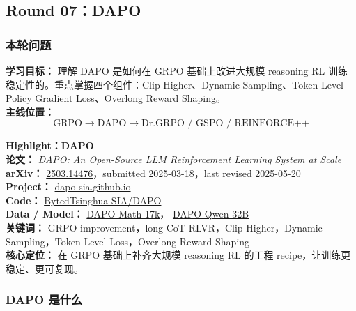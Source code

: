 
\subsection{Round 07：DAPO}

\subsubsection{本轮问题}

\begin{conceptbox}
\textbf{学习目标：} 理解 DAPO 是如何在 GRPO 基础上改进大规模 reasoning RL 训练稳定性的。重点掌握四个组件：Clip-Higher、Dynamic Sampling、Token-Level Policy Gradient Loss、Overlong Reward Shaping。\\
\textbf{主线位置：}
\[
\text{GRPO}
\to
\text{DAPO}
\to
\text{Dr.GRPO / GSPO / REINFORCE++}
\]
\end{conceptbox}

\begin{conceptbox}
\textbf{Highlight：DAPO}\\
\textbf{论文：} \emph{DAPO: An Open-Source LLM Reinforcement Learning System at Scale}\\
\textbf{arXiv：} \href{https://arxiv.org/abs/2503.14476}{2503.14476}，submitted 2025-03-18，last revised 2025-05-20\\
\textbf{Project：} \href{https://dapo-sia.github.io/}{dapo-sia.github.io}\\
\textbf{Code：} \href{https://github.com/BytedTsinghua-SIA/DAPO}{BytedTsinghua-SIA/DAPO}\\
\textbf{Data / Model：} \href{https://huggingface.co/datasets/BytedTsinghua-SIA/DAPO-Math-17k}{DAPO-Math-17k}，
\href{https://huggingface.co/BytedTsinghua-SIA/DAPO-Qwen-32B}{DAPO-Qwen-32B}\\
\textbf{关键词：} GRPO improvement，long-CoT RLVR，Clip-Higher，Dynamic Sampling，Token-Level Loss，Overlong Reward Shaping\\
\textbf{核心定位：} 在 GRPO 基础上补齐大规模 reasoning RL 的工程 recipe，让训练更稳定、更可复现。
\end{conceptbox}

\subsubsection{DAPO 是什么}

